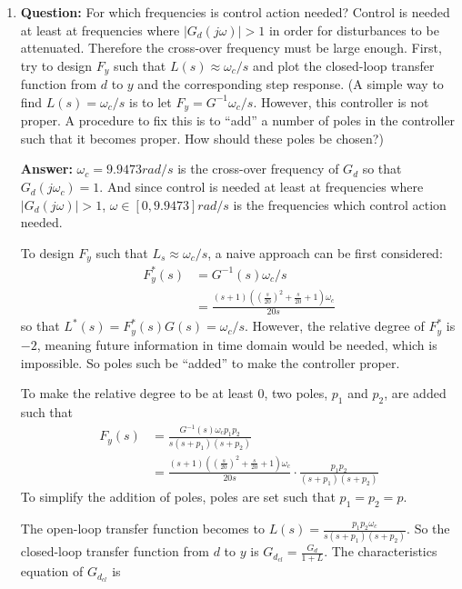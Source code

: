 \documentclass[11pt,a4paper]{article}
\begin{document}
\begin{enumerate}[(1)]
	\item \textbf{Question:} For which frequencies is control action needed? Control is needed at least at frequencies where $\vert G_{d}(j\omega) \vert > 1$ in order for disturbances to be attenuated. Therefore the cross-over frequency must be large enough. First, try to design $F_{y}$ such that $L(s) \approx \omega_{c} / s$ and plot the closed-loop transfer function from $d$ to $y$ and the corresponding step response. (A simple way to find $L(s) = \omega_{c} / s$ is to let $F_{y} = G^{-1} \omega_{c} / s$. However, this controller is not proper. A procedure to fix this is to ``add'' a number of poles in the controller such that it becomes proper. How should these poles be chosen?)
	\par \textbf{Answer:} $\omega_{c} = 9.9473 rad/s$ is the cross-over frequency of $G_{d}$ so that $G_{d}(j\omega_{c}) = 1$. And since control is needed at least at frequencies where $\vert G_{d}(j\omega) \vert > 1$, $\omega \in [0, 9.9473] rad/s$ is the frequencies which control action needed.
	\par To design $F_{y}$ such that $L_{s} \approx \omega_{c} / s$, a naive approach can be first considered:
	\begin{align*}
		F_{y}^{*}(s) &= G^{-1}(s) \omega_{c} / s \\
		&= \frac{(s+1)((\frac{s}{20})^{2}+\frac{s}{20}+1)\omega_{c}}{20s}
	\end{align*}
	so that $L^{*}(s) = F_{y}^{*}(s) G(s) = \omega_{c} / s$. However, the relative degree of $F_{y}^{*}$ is $-2$, meaning future information in time domain would be needed, which is impossible. So poles such be ``added'' to make the controller proper.
	\par To make the relative degree to be at least $0$, two poles, $p_{1}$ and $p_{2}$, are added such that
	\begin{align*}
		F_{y}(s) &= \frac{G^{-1}(s)\omega_{c}p_{1}p_{2}}{s(s+p_{1})(s+p_{2})} \\
		&= \frac{(s+1)((\frac{s}{20})^{2}+\frac{s}{20}+1)\omega_{c}}{20s} \cdot \frac{p_{1}p_{2}}{(s+p_{1})(s+p_{2})}
	\end{align*}
	To simplify the addition of poles, poles are set such that $p_{1}=p_{2}=p$.
	\par The open-loop transfer function becomes to $L(s) = \frac{p_{1}p_{2}\omega_{c}}{s(s+p_{1})(s+p_{2})}$. So the closed-loop transfer function from $d$ to $y$ is $G_{d_{cl}}=\frac{G_{d}}{1+L}$. The characteristics equation of $G_{d_{cl}}$ is

\end{enumerate}
\end{document}
